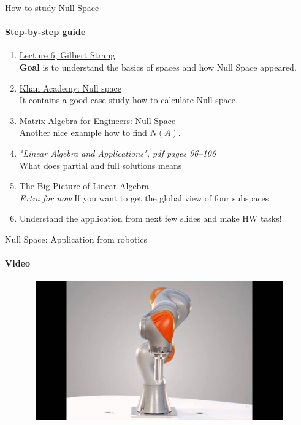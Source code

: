 \documentclass[aspectratio=169]{beamer}
\begin{document}
\begin{frame}[t]{How to study Null Space}
    \framesubtitle{Step-by-step guide}
    \vspace{-0.65cm}
    \small
    \begin{enumerate}
        \item \href{https://youtu.be/8o5Cmfpeo6g}{Lecture 6, Gilbert Strang} \\ \textbf{Goal} is to understand the basics of spaces and how Null Space appeared.
        \item \href{https://www.youtube.com/watch?v=_uTAdf_AsfQ}{Khan Academy: Null space} \\ It contains a good case study how to calculate Null space.
        \item \href{https://www.youtube.com/watch?v=C8zOd07U3l8}{Matrix Algebra for Engineers: Null Space} \\ Another nice example how to find $N(A)$.
        \item \textit{"Linear Algebra and Applications", pdf pages 96--106 } \\ What does partial and full solutions means
        \item \href{https://www.youtube.com/watch?v=ggWYkes-n6E}{The Big Picture of Linear Algebra} \\ \textit{Extra for now} If you want to get the global view of four subspaces
        \item Understand the application from next few slides and make HW tasks!
    \end{enumerate}
\end{frame}

\begin{frame}[t]{Null Space: Application from robotics}
    \framesubtitle{Video}
    \vspace{-0.6cm}
    \begin{figure}[H]
        \href{https://youtu.be/sZYBC8Lrmdo}{
            \centering\includegraphics[height=6cm,width=1\textwidth,keepaspectratio]{kuka.jpg}}
        \label{fig:kuka.jpg}
    \end{figure}
\end{frame}
\end{document}
